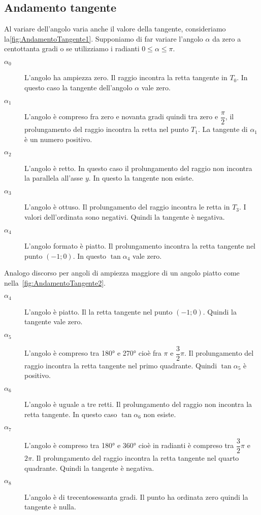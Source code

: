 \subsection{Andamento tangente}
\label{sec:AndamentoTangente}
Al variare dell'angolo varia anche il valore della tangente, consideriamo la\nobs\vref{fig:AndamentoTangente1}. Supponiamo di far variare l'angolo $\alpha$ da zero a centottanta gradi o se utilizziamo i radianti $0\leq\alpha\leq\pi$. 
\begin{description}
	\item[$\alpha_0$] L'angolo ha ampiezza zero. Il raggio incontra la retta tangente in $T_0$. In questo caso la tangente dell'angolo $\alpha$ vale zero.
	\item [$\alpha_1$] L'angolo è compreso fra zero e novanta gradi quindi tra zero e $\dfrac{\pi}{2}$, il prolungamento del raggio incontra la retta nel punto $T_1$. La tangente di $\alpha_1$ è un numero positivo.
	\item [$\alpha_2$] L'angolo è retto. In questo caso il prolungamento del raggio non incontra la parallela all'asse $y$. In questo la tangente non esiste. 
	\item [$\alpha_3$] L'angolo è ottuso. Il prolungamento del raggio incontra le retta in $T_3$. I valori dell'ordinata sono negativi. Quindi la tangente è negativa.
	\item [$\alpha_4$] L'angolo formato è piatto. Il prolungamento incontra la retta tangente nel punto $(-1;0)$. In questo $\tan\alpha_4$ vale zero.
\end{description}
Analogo discorso per angoli di ampiezza maggiore di un angolo piatto come nella~\vref{fig:AndamentoTangente2}.
\begin{description}
	\item [$\alpha_4$] L'angolo è piatto. Il  la retta tangente nel punto $(-1;0)$. Quindi la tangente vale zero.
	\item [$\alpha_5$] L'angolo è compreso tra \ang{180} e \ang{270} cioè fra $\pi$ e $\dfrac{3}{2}\pi$. Il prolungamento del raggio incontra la retta tangente nel primo quadrante. Quindi $\tan\alpha_5$ è positivo.
	\item [$\alpha_6$] L'angolo è uguale a tre retti. Il prolungamento del raggio non incontra la retta tangente. In questo caso $\tan\alpha_6$ non esiste. 
	\item [$\alpha_7$] L'angolo è compreso tra \ang{180} e \ang{360} cioè in radianti è compreso tra $\dfrac{3}{2}\pi$ e $2\pi$. Il prolungamento del raggio incontra la retta tangente nel quarto quadrante. Quindi la tangente è negativa.
	\item [$\alpha_8$] L'angolo è di trecentosessanta gradi. Il punto ha ordinata zero quindi la tangente è nulla.
\end{description}
